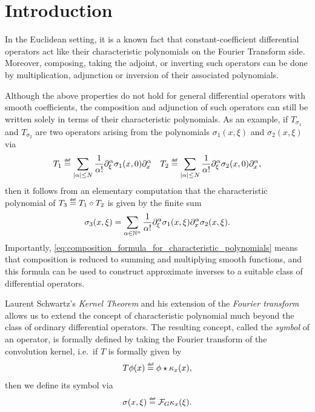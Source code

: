 \chapter{Introduction}

In the Euclidean setting,
it is a known fact that constant-coefficient differential operators act like their characteristic polynomials on the Fourier Transform side.
Moreover, composing, taking the adjoint, or inverting such operators can be done by multiplication, adjunction or inversion of their associated polynomials.

Although the above properties do not hold for general differential operators with smooth coefficients,
the composition and adjunction of such operators can still be written solely in terms of their characteristic polynomials.
As an example,
if $T_{\sigma_1}$ and $T_{\sigma_2}$ are two operators arising from the polynomials $\sigma_1(x, \xi)$ and $\sigma_2(x, \xi)$ via
\begin{align*}
    T_1 \defeq \sum_{\abs \alpha \leq N} \frac 1 {\alpha!} \iD{\xi^\alpha} \sigma_1(x, 0) \iD{x^\alpha}
    \quad
    T_2 \defeq \sum_{\abs \alpha \leq N} \frac 1 {\alpha!} \iD{\xi^\alpha} \sigma_2(x, 0) \iD{x^\alpha},
\end{align*}
then it follows from an elementary computation
that the characteristic polynomial of $T_3 \defeq T_1 \circ T_2$ is given by the finite sum
\begin{align}
    \sigma_3(x, \xi) = \sum_{\alpha \in \N^n} \frac 1 {\alpha!} \iD{\xi^\alpha} \sigma_1(x, \xi) \iD{x^\alpha} \sigma_2(x, \xi)
    \label{eq:composition_formula_for_characteristic_polynomials}.
\end{align}
Importantly,
\eqref{eq:composition_formula_for_characteristic_polynomials} means that
composition is reduced to summing and multiplying smooth functions,
and this formula can be used to construct approximate inverses to a suitable class of differential operators.

Laurent Schwartz's \emph{Kernel Theorem} and his extension of the \emph{Fourier transform} allows us to extend the concept of characteristic polynomial much beyond the class of ordinary differential operators.
The resulting concept, called the \emph{symbol} of an operator,
is formally defined by taking the Fourier transform of the convolution kernel,
i.e.\ if $T$ is formally given by
\begin{align*}
    T \phi(x) \defeq \conv \phi {\kappa_x}(x),
\end{align*}
then we define its symbol via
\begin{align*}
    \sigma(x, \xi) \defeq \Fourier \kappa_x(\xi).
\end{align*}

